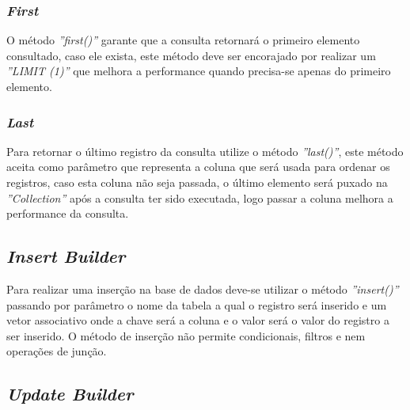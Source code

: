 \spaceH{}

\label{scripts/query_with_having.php}

\subsubsection{\textit{First}}

O método \textit{''first()''} garante que a consulta retornará o primeiro elemento consultado, caso ele exista, este método deve ser encorajado por realizar um \textit{''LIMIT (1)''} que melhora a performance quando precisa-se apenas do primeiro elemento.

\spaceH{}

\label{scripts/query_with_first.php}

\subsubsection{\textit{Last}}
Para retornar o último registro da consulta utilize o método \textit{''last()''}, este método aceita como parâmetro que representa a coluna que será usada para ordenar os registros, caso esta coluna não seja passada, o último elemento será puxado na \textit{''Collection''} após a consulta ter sido executada, logo passar a coluna melhora a performance da consulta.


\label{scripts/query_with_last.php}

\subsection{\textit{Insert Builder}}

Para realizar uma inserção na base de dados deve-se utilizar o método \textit{''insert()''} passando por parâmetro o nome da tabela a qual o registro será inserido e um vetor associativo onde a chave será a coluna e o valor será o valor do registro a ser inserido. O método de inserção não permite condicionais, filtros e nem operações de junção.


\label{scripts/insert_builder.php}

\subsection{\textit{Update Builder}}

